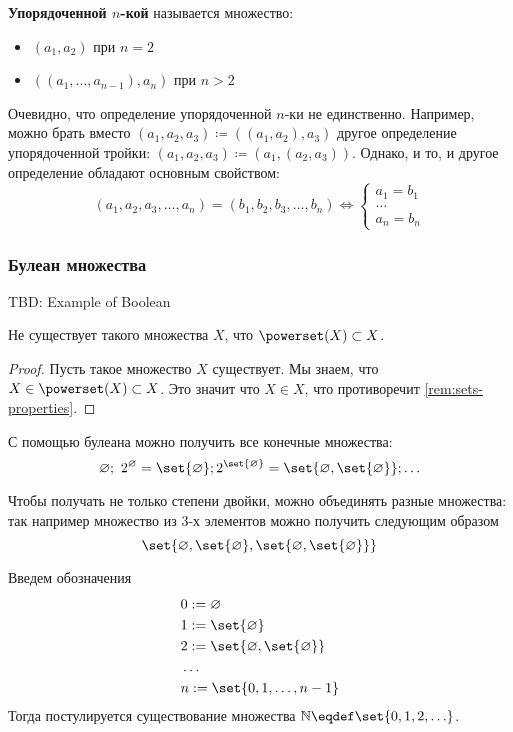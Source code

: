 \documentclass{article}
\begin{document}
    \begin{definition}
        \label{def:ordered-cortege}
        \textbf{Упорядоченной \(n\)-кой} называется множество:
        \begin{itemize}
            \item  \((a_1, a_2)\) при \(n=2\)
            \item \(((a_1, \ldots, a_{n-1}), a_n)\) при \(n > 2\)
        \end{itemize}
    \end{definition}
    \begin{remark}
        \label{rem:ordered-pair-universal-property}
        Очевидно, что определение упорядоченной \(n\)-ки не единственно. Например, можно брать вместо \((a_1, a_2, a_3) \coloneq ((a_1, a_2), a_3)\) другое определение упорядоченной тройки: \((a_1, a_2, a_3) \coloneq (a_1, (a_2, a_3))\). Однако, и то, и другое определение обладают основным свойством:
        \[(a_1, a_2, a_3, \ldots, a_n) = (b_1, b_2, b_3, \ldots, b_n) \Leftrightarrow \begin{cases} a_1 = b_1 \\ \ldots\\ a_n = b_n\end{cases}\]
    \end{remark}

\subsubsection{Булеан множества}

    TBD: Example of Boolean

    \begin{proposition}
        \label{prop:powerset-notsubset-set}
        Не существует такого множества \(X\), что \(\powerset(X) \subset X\).
    \end{proposition}
    \begin{proof}
        Пусть такое множество \(X\) существует.
        Мы знаем, что \(X \in \powerset(X) \subset X\). Это значит что \(X \in X\), что противоречит \ref{rem:sets-properties}.
    \end{proof}

    С помощью булеана можно получить все конечные множества:
    \[\varnothing;\ 2^\varnothing = \set{\varnothing}; 2^{\set{\varnothing}} = \set{\varnothing, \set{\varnothing}}; \ldots\]
    \begin{remark}
        Чтобы получать не только степени двойки, можно объединять разные множества: так например множество из 3-х элементов можно получить следующим образом 
        \[\set{\varnothing, \set{\varnothing}, \set{\varnothing, \set{\varnothing}}}\] 
    \end{remark}
    Введем обозначения
    \begin{align}
        &0 := \varnothing \\
        &1 := \set{\varnothing}\\
        &2 := \set{\varnothing, \set{\varnothing}} \\
        &\dots \\
        &n := \set{0, 1, \ldots, n - 1}
    \end{align}
    Тогда постулируется существование множества \(\mathbb N \eqdef \set{0, 1, 2, \ldots}\). 
\end{document}
